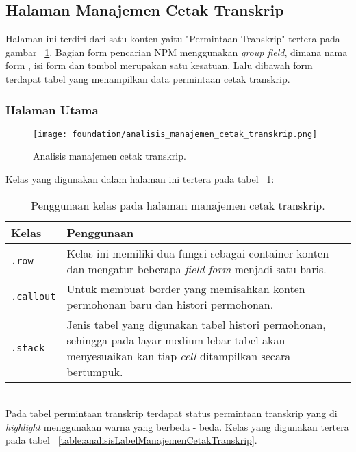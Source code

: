 \subsection{Halaman Manajemen Cetak Transkrip}
Halaman ini terdiri dari satu konten yaitu "Permintaan Transkrip" tertera pada gambar ~\ref{fig:analisisManajemenCetakTranskrip}. Bagian form pencarian NPM menggunakan \textit{group field}, dimana nama form , isi form dan tombol merupakan satu kesatuan. Lalu dibawah form terdapat tabel yang menampilkan data permintaan cetak transkrip. 
\subsubsection{Halaman Utama}
\begin{figure} [H]
	\centering  
	\texttt{[image: foundation/analisis\_manajemen\_cetak\_transkrip.png]}
	\caption{Analisis manajemen cetak transkrip.} 
	\label{fig:analisisManajemenCetakTranskrip}
\end{figure} 

Kelas yang digunakan dalam halaman ini tertera pada tabel ~\ref{table:analisisManajemenCetakTranskrip}:\\
\begin{table}[H]
	\centering
	\caption{Penggunaan kelas pada halaman manajemen cetak transkrip.}
	\begin{tabularx}{\textwidth}{lX}
		\toprule
		Kelas     & Penggunaan \\
		\midrule
		\texttt{.row} & Kelas ini memiliki dua fungsi sebagai container konten dan mengatur beberapa \textit{field-form} menjadi satu baris.\\
		\texttt{.callout} & Untuk membuat border yang memisahkan konten permohonan baru dan histori permohonan.\\
		\texttt{.stack} & Jenis tabel yang digunakan tabel histori permohonan, sehingga pada layar medium lebar tabel akan menyesuaikan kan tiap \textit{cell} ditampilkan secara bertumpuk.\\
		\bottomrule
	\end{tabularx}%
	\label{table:analisisManajemenCetakTranskrip}
\end{table} \\

\noindent Pada tabel permintaan transkrip terdapat status permintaan transkrip yang di \textit{highlight} menggunakan warna yang berbeda - beda. Kelas yang digunakan tertera pada tabel ~\ref{table:analisisLabelManajemenCetakTranskrip}.\\

